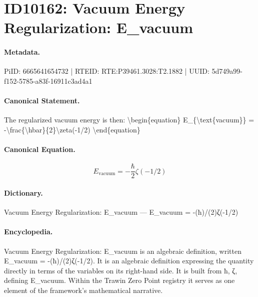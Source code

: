 \section*{ID10162: Vacuum Energy Regularization: E\_vacuum}
\paragraph{Metadata.}
PiID: 6665641654732 | RTEID: RTE:P39461.3028:T2.1882 | UUID: 5d749a99-f152-5785-a83f-16911c3ad4a1

\paragraph{Canonical Statement.}
The regularized vacuum energy is then: \textbackslash{}begin\{equation\} E\_\{\textbackslash{}text\{vacuum\}\} = -\textbackslash{}frac\{\textbackslash{}hbar\}\{2\}\textbackslash{}zeta(-1/2) \textbackslash{}end\{equation\}

\paragraph{Canonical Equation.}
\[
E_{\text{vacuum}} = -\frac{\hbar}{2}\zeta(-1/2)
\]

\paragraph{Dictionary.}
Vacuum Energy Regularization: E\_vacuum — E\_vacuum = -(ħ)/(2)ζ(-1/2)

\paragraph{Encyclopedia.}
Vacuum Energy Regularization: E\_vacuum is an algebraic definition, written E\_vacuum = -(ħ)/(2)ζ(-1/2). It is an algebraic definition expressing the quantity directly in terms of the variables on its right-hand side. It is built from ħ, ζ, defining E\_vacuum. Within the Trawin Zero Point registry it serves as one element of the framework's mathematical narrative.
